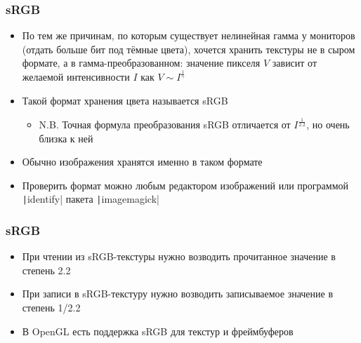 \documentclass[10pt]{beamer}
\begin{document}
\begin{frame}[fragile]
\frametitle{sRGB}
\begin{itemize}
\item По тем же причинам, по которым существует нелинейная гамма у мониторов (отдать больше бит под тёмные цвета), хочется хранить текстуры не в сыром формате, а в гамма-преобразованном: значение пикселя \begin{math}V\end{math} зависит от желаемой интенсивности \begin{math}I\end{math} как \begin{math}V \sim I^\frac{1}{\gamma}\end{math}
\pause
\item Такой формат хранения цвета называется sRGB
\begin{itemize}
\item N.B. Точная формула преобразования sRGB отличается от \begin{math}I^\frac{1}{2.2}\end{math}, но очень близка к ней
\end{itemize}
\pause
\item Обычно изображения хранятся именно в таком формате
\pause
\item Проверить формат можно любым редактором изображений или программой \texttt|identify| пакета \texttt|imagemagick|
\end{itemize}
\end{frame}

\begin{frame}[fragile]
\frametitle{sRGB}
\begin{itemize}
\item При чтении из sRGB-текстуры нужно возводить прочитанное значение в степень 2.2
\pause
\item При записи в sRGB-текстуру нужно возводить записываемое значение в степень 1/2.2
\pause
\item В OpenGL есть поддержка sRGB для текстур и фреймбуферов
\end{itemize}
\end{frame}
\end{document}
